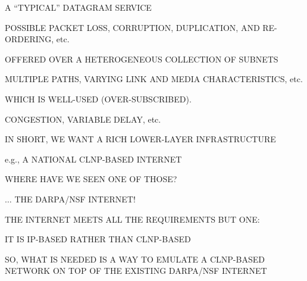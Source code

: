 \begin{bwslide}

\begin{nrtc}
\item	A ``TYPICAL'' DATAGRAM SERVICE
    \begin{nrtc}
    \item	POSSIBLE PACKET LOSS, CORRUPTION, DUPLICATION, AND
		RE-ORDERING, etc.
    \end{nrtc}

\item	OFFERED OVER A HETEROGENEOUS COLLECTION OF SUBNETS
    \begin{nrtc}
    \item	MULTIPLE PATHS, VARYING LINK AND MEDIA CHARACTERISTICS, etc.
    \end{nrtc}

\item	WHICH IS WELL-USED (OVER-SUBSCRIBED).
    \begin{nrtc}
    \item	CONGESTION, VARIABLE DELAY,  etc.
    \end{nrtc}

\item	IN SHORT, WE WANT A RICH LOWER-LAYER INFRASTRUCTURE
    \begin{nrtc}
    \item	e.g., A NATIONAL CLNP-BASED INTERNET
    \end{nrtc}
\end{nrtc}
\end{bwslide}


\begin{bwslide}

\begin{nrtc}
\item	WHERE HAVE WE SEEN ONE OF THOSE?
    \begin{nrtc}
    \item	$\ldots$ THE DARPA/NSF INTERNET!
    \end{nrtc}

\item	THE INTERNET MEETS ALL THE REQUIREMENTS BUT ONE:
    \begin{nrtc}
    \item	IT IS IP-BASED RATHER THAN CLNP-BASED
    \end{nrtc}

\item	SO, WHAT IS NEEDED IS A WAY TO EMULATE A CLNP-BASED NETWORK
	ON TOP OF THE EXISTING DARPA/NSF INTERNET
\end{nrtc}
\end{bwslide}


